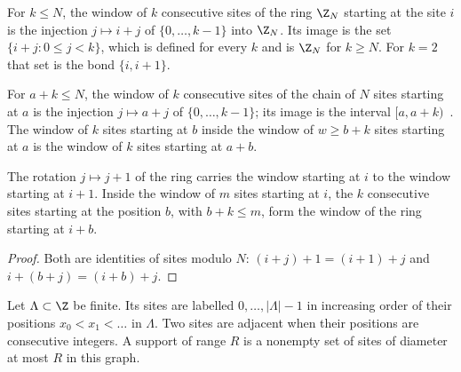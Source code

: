 \begin{definition}
    \label{def:sites_ring_window}
    \leanok
    For $k\le N$, the window of $k$ consecutive sites of the ring $\Z_N$ starting at the
    site $i$ is the injection $j\mapsto i+j$ of $\{0,\dots,k-1\}$ into $\Z_N$. Its image
    is the set $\{i+j: 0\le j<k\}$, which is defined for every $k$ and is $\Z_N$ for
    $k\ge N$. For $k=2$ that set is the bond $\{i,i+1\}$.
\end{definition}

\begin{definition}
    \label{def:sites_chain_window}
    \leanok
    For $a+k\le N$, the window of $k$ consecutive sites of the chain of $N$ sites starting
    at $a$ is the injection $j\mapsto a+j$ of $\{0,\dots,k-1\}$; its image is the interval
    $[a,a+k)$~\cite{Landau2013PolynomialTime}. The window of $k$ sites starting at $b$ inside
    the window of $w\ge b+k$ sites starting at $a$ is the window of $k$ sites starting at
    $a+b$.
\end{definition}

\begin{lemma}
    \label{lem:sites_ring_window}
    \leanok
    The rotation $j\mapsto j+1$ of the ring carries the window starting at $i$ to the window
    starting at $i+1$. Inside the window of $m$ sites starting at $i$, the $k$ consecutive
    sites starting at the position $b$, with $b+k\le m$, form the window of the ring starting
    at $i+b$.
\end{lemma}
\begin{proof}\leanok
    Both are identities of sites modulo $N$: $(i+j)+1=(i+1)+j$ and
    $i+(b+j)=(i+b)+j$.
\end{proof}

\begin{definition}
    \label{def:sites_line_domain}
    \leanok
    Let $\Lambda\subset\Z$ be finite. Its sites are labelled
    $0,\dots,\lvert\Lambda\rvert-1$ in increasing order of their positions
    $x_0<x_1<\dots$ in $\Lambda$. Two sites are adjacent when their positions
    are consecutive integers. A support of range $R$ is a nonempty set of sites
    of diameter at most $R$ in this graph.
\end{definition}

